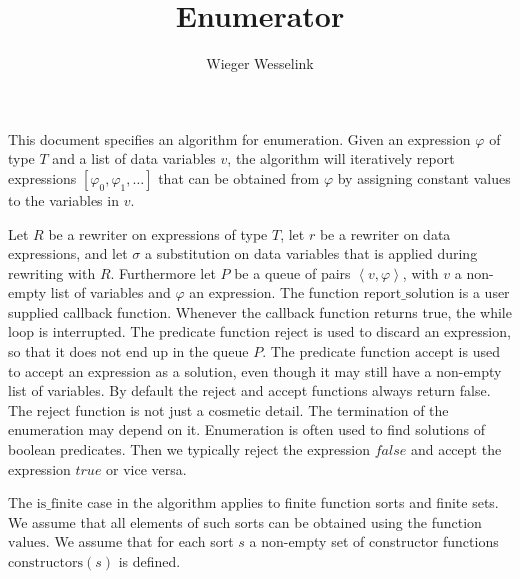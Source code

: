 \documentclass{article}
\begin{document}
\title{Enumerator}
\author{Wieger Wesselink}
\maketitle

This document specifies an algorithm for enumeration. Given an expression $\varphi$ of type $T$ and a list of data variables $v$, the algorithm will iteratively report expressions
$[\varphi_0, \varphi_1, \ldots]$ that can be obtained from $\varphi$ by assigning
constant values to the variables in $v$.

Let $R$ be a rewriter on expressions of type $T$, let $r$ be a rewriter on
data expressions, and let $\sigma $ a substitution on data variables that is
applied during rewriting with $R$. Furthermore let $P$ be a queue of pairs
$\left\langle v,\varphi \right\rangle$, with $v$ a non-empty list of variables and
$\varphi$ an expression. The function $\mathrm{report\_solution}$ is a user supplied callback function. Whenever the callback function returns true, the while loop is interrupted.
The predicate function $\mathrm{reject}$ is used to discard
an expression, so that it does not end up in the queue $P$. The predicate function $\mathrm{accept}$ is used to accept an expression as a solution, even though it
may still have a non-empty list of variables. By default the reject and accept functions
always return false. The $\mathrm{reject}$ function is not just a cosmetic detail. The termination of the enumeration may depend on it.
Enumeration is often used to find solutions of boolean predicates. Then we typically reject the expression $false$ and accept the expression $true$ or vice versa.

The $\mathrm{is\_finite}$ case in the algorithm applies to finite function sorts and finite sets. We assume that all elements of such sorts can be obtained using the function $\mathrm{values}$. We assume that for each sort $s$ a non-empty set of
constructor functions $\mathrm{constructors}(s)$ is defined.
\end{document}
